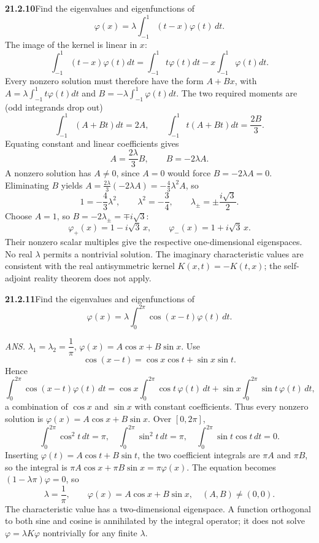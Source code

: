\par\bigskip
\noindent\textbf{21.2.10}\quad Find the eigenvalues and
eigenfunctions of
\[
\varphi(x)=\lambda\int_{-1}^{1}(t-x)\varphi(t)\,dt.
\]
\solution
The image of the kernel is linear in $x$:
\[
\int_{-1}^1(t-x)\varphi(t)dt
=\int_{-1}^1t\varphi(t)dt-x\int_{-1}^1\varphi(t)dt.
\]
Every nonzero solution must therefore have the form $A+Bx$, with
$A=\lambda\int_{-1}^1t\varphi(t)dt$ and $B=-\lambda\int_{-1}^1\varphi(t)dt$.
The two required moments are (odd integrands drop out)
\[
\int_{-1}^1(A+Bt)dt=2A,\qquad
\int_{-1}^1t(A+Bt)dt=\frac{2B}{3}.
\]
Equating constant and linear coefficients gives
\[
A=\frac{2\lambda}{3}B,\qquad B=-2\lambda A.
\]
A nonzero solution has $A\ne0$, since $A=0$ would force
$B=-2\lambda A=0$. Eliminating $B$ yields
$A=\frac{2\lambda}{3}(-2\lambda A)=-\frac43\lambda^2A$, so
\[
1=-\frac43\lambda^2,\qquad\lambda^2=-\frac34,\qquad
\boxed{\lambda_\pm=\pm\frac{i\sqrt3}{2}}.
\]
Choose $A=1$, so $B=-2\lambda_\pm=\mp i\sqrt3$:
\[
\boxed{\varphi_+(x)=1-i\sqrt3\,x,\qquad
\varphi_-(x)=1+i\sqrt3\,x}.
\]
Their nonzero scalar multiples give the respective one-dimensional
eigenspaces. No real $\lambda$ permits a nontrivial solution.
The imaginary characteristic values are consistent with the real
antisymmetric kernel $K(x,t)=-K(t,x)$; the self-adjoint reality theorem
does not apply.


\par\bigskip
\noindent\textbf{21.2.11}\quad Find the eigenvalues and
eigenfunctions of
\[
\varphi(x)=\lambda\int_{0}^{2\pi}\cos(x-t)\varphi(t)\,dt.
\]
\par\nobreak\hfill\emph{ANS.}\enspace
$\lambda_{1}=\lambda_{2}=\dfrac{1}{\pi}$,\qquad
$\varphi(x)=A\cos x+B\sin x$.
\solution
Use
\[
\cos(x-t)=\cos x\cos t+\sin x\sin t.
\]
Hence
\[
\int_0^{2\pi}\cos(x-t)\varphi(t)\,dt
=\cos x\int_0^{2\pi}\cos t\,\varphi(t)\,dt
+\sin x\int_0^{2\pi}\sin t\,\varphi(t)\,dt,
\]
a combination of $\cos x$ and $\sin x$ with constant coefficients.
Thus every nonzero solution is $\varphi(x)=A\cos x+B\sin x$.
Over $[0,2\pi]$,
\[
\int_0^{2\pi}\cos^2t\,dt=\pi,\quad
\int_0^{2\pi}\sin^2t\,dt=\pi,\quad
\int_0^{2\pi}\sin t\cos t\,dt=0.
\]
Inserting $\varphi(t)=A\cos t+B\sin t$, the two coefficient integrals
are $\pi A$ and $\pi B$, so the integral is
$\pi A\cos x+\pi B\sin x=\pi\varphi(x)$.
The equation becomes $(1-\lambda\pi)\varphi=0$, so
\[
\boxed{\lambda=\frac1\pi,\qquad
\varphi(x)=A\cos x+B\sin x,\quad(A,B)\ne(0,0)}.
\]
The characteristic value has a two-dimensional eigenspace.
A function orthogonal to both sine and cosine is annihilated by the
integral operator; it does not solve $\varphi=\lambda K\varphi$
nontrivially for any finite $\lambda$.


